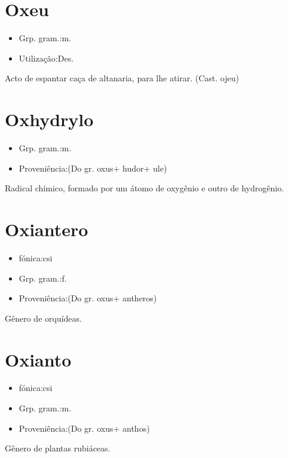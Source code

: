 \section{Oxeu}
\begin{itemize}
\item {Grp. gram.:m.}
\end{itemize}
\begin{itemize}
\item {Utilização:Des.}
\end{itemize}
Acto de espantar caça de altanaria, para lhe atirar.
(Cast. \textunderscore ojeu\textunderscore )
\section{Oxhydrylo}
\begin{itemize}
\item {Grp. gram.:m.}
\end{itemize}
\begin{itemize}
\item {Proveniência:(Do gr. \textunderscore oxus\textunderscore  + \textunderscore hudor\textunderscore  + \textunderscore ule\textunderscore )}
\end{itemize}
Radical chímico, formado por um átomo de oxygênio e outro de hydrogênio.
\section{Oxiantero}
\begin{itemize}
\item {fónica:csi}
\end{itemize}
\begin{itemize}
\item {Grp. gram.:f.}
\end{itemize}
\begin{itemize}
\item {Proveniência:(Do gr. \textunderscore oxus\textunderscore  + \textunderscore antheros\textunderscore )}
\end{itemize}
Gênero de orquídeas.
\section{Oxianto}
\begin{itemize}
\item {fónica:csi}
\end{itemize}
\begin{itemize}
\item {Grp. gram.:m.}
\end{itemize}
\begin{itemize}
\item {Proveniência:(Do gr. \textunderscore oxus\textunderscore  + \textunderscore anthos\textunderscore )}
\end{itemize}
Gênero de plantas rubiáceas.
